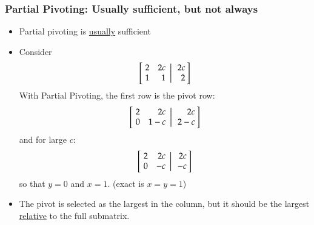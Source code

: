 \documentclass[10pt]{beamer}
\begin{document}
\begin{frame}
\frametitle{Partial Pivoting: Usually sufficient, but not always}
\begin{itemize}
  \item Partial pivoting is {\underline{usually}} sufficient
  \item Consider
\begin{equation*}
    \left[
           \left.\negthickspace\begin{array}{rr}  2 &  2c\\
                                                    1 &  1\end{array}
           \right|\begin{array}{r} 2c \\ 2\end{array}\negthickspace\right]
\end{equation*}
With Partial Pivoting, the first row is the pivot row:
\begin{equation*}
    \left[
           \left.\negthickspace\begin{array}{rr}  2 &  2c\\
                                                    0 &  1-c\end{array}
           \right|\begin{array}{r} 2c \\ 2-c\end{array}\negthickspace\right]
\end{equation*}
and for large $c$:
\begin{equation*}
    \left[
           \left.\negthickspace\begin{array}{rr}  2 &  2c\\
                                                    0 &  -c\end{array}
           \right|\begin{array}{r} 2c \\ -c\end{array}\negthickspace\right]
\end{equation*}
so that $y=0$ and $x=1$. (exact is $x=y=1$)
\item The pivot is selected as the largest in the column, but it should be the
largest \underline{relative} to the full submatrix.
\end{itemize}
\end{frame}
\end{document}
